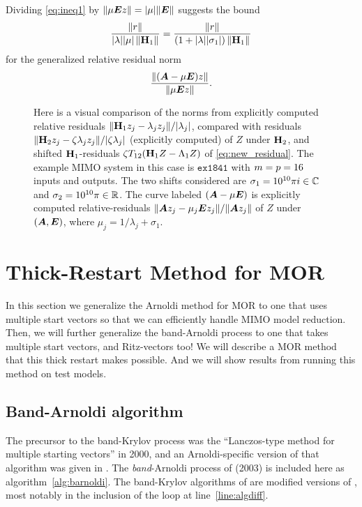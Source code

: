 Dividing \eqref{eq:ineq1} by $\| \mu \bm{E} z\|  = |\mu| \|\bm{E}\|$ suggests the bound
\begin{equation}
\frac{\left\| r \right\|_{}}{|\lambda||\mu | \left\| \textbf{\textup{H}}_1 \right\|_{}}
=\frac{\left\| r \right\|_{}}{(1+|\lambda||\sigma_1|)\left\| \textbf{\textup{H}}_1 \right\|_{}}
\label{eq:gen_rel_residual}
\end{equation} 
for the generalized relative residual norm
\[
\frac{\|(\bm{A}-\mu \bm{E} )z\|}{\| \mu \bm{E} z\|}.
\]

\begin{figure}
\centering
{}
\caption{\label{fig:relresidnorms2} Here is a visual comparison of the norms from explicitly computed relative residuals $\| \textbf{\textup{H}}_1 z_j - \lambda_j z_j \| / |\lambda_j|$, compared with residuals $\| \textbf{\textup{H}}_2 z_j - \zeta\lambda_j z_j\|/ |\zeta\lambda_j|$ (explicitly computed)  of $Z$ under $\textbf{\textup{H}}_2$, and shifted $\textbf{\textup{H}}_1$-residuals $\zeta T_{12}(\textbf{\textup{H}}_1 Z - \Lambda_1 Z)$ of \eqref{eq:new_residual}.   The example MIMO system in this case is $\texttt{ex1841}$ with $m=p=16$ inputs and outputs.  The two shifts considered are $\sigma_1= 10^{10}\pi i\in\mathbb{C}$ and $\sigma_2 = 10^{10}\pi\in\mathbb{R}$.  The curve labeled $(\bm{A}-\mu \bm{E})$ is explicitly computed relative-residuals $\| \bm{A} z_j - \mu_j \bm{E} z_j\| / \| \bm{A} z_j \|$ of $Z$ under $(\bm{A},\bm{E})$, where $\mu_j = 1/\lambda_j + \sigma_1$.
} 
\end{figure}


\section{Thick-Restart Method for MOR}
In this section we generalize the Arnoldi method for MOR to one that uses multiple start vectors so that we can efficiently handle MIMO model reduction.  Then, we will further generalize the band-Arnoldi process to one that takes multiple start vectors, and Ritz-vectors too!   We will describe a MOR method that this thick restart makes possible.  And we will show results from running this method on test models.      


\subsection{Band-Arnoldi algorithm}
The precursor to the band-Krylov process was the ``Lanczos-type method for multiple starting vectors'' \cite{AliagaMIMO} in 2000, and an Arnoldi-specific version of that algorithm was given in \cite{freund2000b}.  The \emph{band}-Arnoldi process of \cite{AN} (2003) is included here as algorithm~\ref{alg:barnoldi}.  The band-Krylov algorithms of \cite{AN}  are modified versions of \cite{AliagaMIMO,freund2000b}, most notably in the inclusion of the loop at line~\ref{line:algdiff}.    

